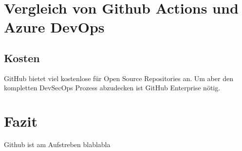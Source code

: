 \chapter{Vergleich von Github Actions und Azure DevOps}

\section{Kosten}
GitHub bietet viel kostenlose für Open Source Repositories an. Um aber den kompletten DevSecOps Prozess abzudecken ist GitHub Enterprise nötig.

\chapter{Fazit}
Github ist am Aufstreben blablabla